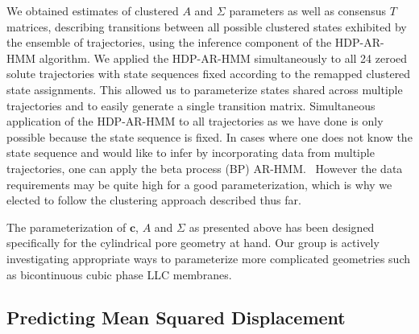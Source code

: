 \documentclass[journal=jpcbfk,manuscript=article]{achemso}
\begin{document}
  We obtained estimates of clustered $A$ and $\Sigma$ parameters as well as
  consensus $T$ matrices, describing transitions between all possible clustered states 
  exhibited by the ensemble of trajectories, using the inference component of 
  the HDP-AR-HMM algorithm. We applied the HDP-AR-HMM simultaneously to all 24
  zeroed solute trajectories with state sequences fixed according to the remapped 
  clustered state assignments. This allowed us to parameterize states shared 
  across multiple trajectories and to easily generate a single transition matrix. 
  Simultaneous application of the HDP-AR-HMM to all trajectories as we have done 
  is only possible because the state sequence is fixed. In cases where one does not 
  know the state sequence and would like to infer by incorporating data from 
  multiple trajectories, one can apply the beta process (BP) AR-HMM.~\cite{fox_sharing_2009} 
  However the data requirements may be quite high for a good parameterization, 
  which is why we elected to follow the clustering approach described thus far.

  The parameterization of $\mathbf{c}$, $A$ and $\Sigma$ as presented above has been designed 
  specifically for the cylindrical pore geometry at hand. Our group is actively investigating
  appropriate ways to parameterize more complicated geometries such as bicontinuous cubic phase
  LLC membranes. 
  
  \subsection{Predicting Mean Squared Displacement}\label{method:realizations}
\end{document}
